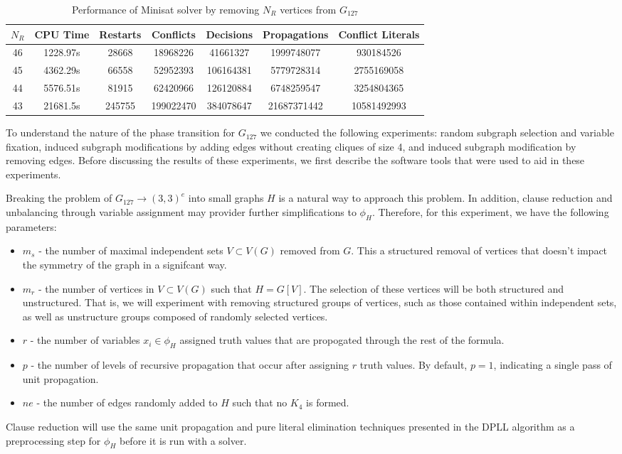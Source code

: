 \documentclass[paper=a4, fontsize=11pt]{scrartcl} %
\begin{document}
\begin{table}
	\caption{Performance of Minisat solver by removing $N_R$ vertices from $G_{127}$}
	\begin{tabular}{c | c | c | c | c | c | c}
		\hline
		$N_R$ & CPU Time & Restarts & Conflicts & Decisions & Propagations & Conflict Literals \\ \hline
		46 & 1228.97s & 28668 & 18968226 & 41661327 & 1999748077 & 930184526 \\ 
		45 & 4362.29s & 66558 & 52952393 & 106164381 & 5779728314 & 2755169058 \\ 
		44 & 5576.51s & 81915 & 62420966 & 126120884 & 6748259547 & 3254804365 \\ 
		43 & 21681.5s & 245755 & 199022470 & 384078647 & 21687371442 & 10581492993 \\ 
		\hline
	\end{tabular}
	\label{tab:performanceSat}
\end{table}

To understand the nature of the phase transition for $G_{127}$ we conducted the following
experiments: random subgraph selection and variable fixation, induced subgraph modifications
by adding edges without creating cliques of size 4, and induced subgraph modification
by removing edges. Before discussing the results of these experiments, we first describe
the software tools that were used to aid in these experiments.

Breaking the problem of $G_{127} \to (3,3)^e$ into small graphs $H$ is a natural way
to approach this problem. In addition, clause reduction and unbalancing through
variable assignment may provider further simplifications to $\phi_H$.
Therefore, for this experiment, we have the following parameters:
\begin{itemize}
	\item $m_s$ - the number of maximal independent sets $V \subset V(G)$ removed from $G$. This a structured removal of vertices that doesn't impact the symmetry of the graph in a signifcant way.
	\item $m_r$ - the number of vertices in $V \subset V(G)$ such that $H = G[V]$. The selection of
	these vertices will be both structured and unstructured. That is, we will experiment
	with removing structured groups of vertices, such as those contained within independent 
	sets, as well as unstructure groups composed of randomly selected vertices.
	\item $r$ - the number of variables $x_i \in \phi_H$ assigned truth values that are
	propogated through the rest of the formula. 
	\item $p$ - the number of levels of recursive propagation that occur after assigning 
	$r$ truth values. By default, $p = 1$, indicating a single pass of unit propagation.
	\item $ne$ - the number of edges randomly added to $H$ such that no $K_4$ is formed. 
\end{itemize}
Clause reduction will use the same unit propagation and pure literal elimination techniques
presented in the DPLL algorithm as a preprocessing step for $\phi_H$ before it is run with a solver.
\end{document}
